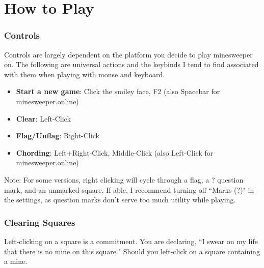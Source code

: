 \section{How to Play}

\subsubsection*{Controls}
Controls are largely dependent on the platform you decide to play minesweeper on. The following are universal actions and the keybinds I tend to find associated with them when playing with mouse and keyboard.
\begin{itemize}
    \item \textbf{Start a new game}: Click the smiley face, F2 (also Spacebar for minesweeper.online)
    \item \textbf{Clear}: Left-Click
    \item \textbf{Flag/Unflag}: Right-Click
    \item \textbf{Chording}: Left+Right-Click, Middle-Click (also Left-Click for minesweeper.online)
\end{itemize}
Note: For some versions, right clicking will cycle through a flag, a ? question mark, and an unmarked square. If able, I recommend turning off ``Marks (?)" in the settings, as question marks don't serve too much utility while playing.\\


\subsubsection*{Clearing Squares}
Left-clicking on a square is a commitment. You are declaring, ``I swear on my life that there is no mine on this square." Should you left-click on a square containing a mine.\\

